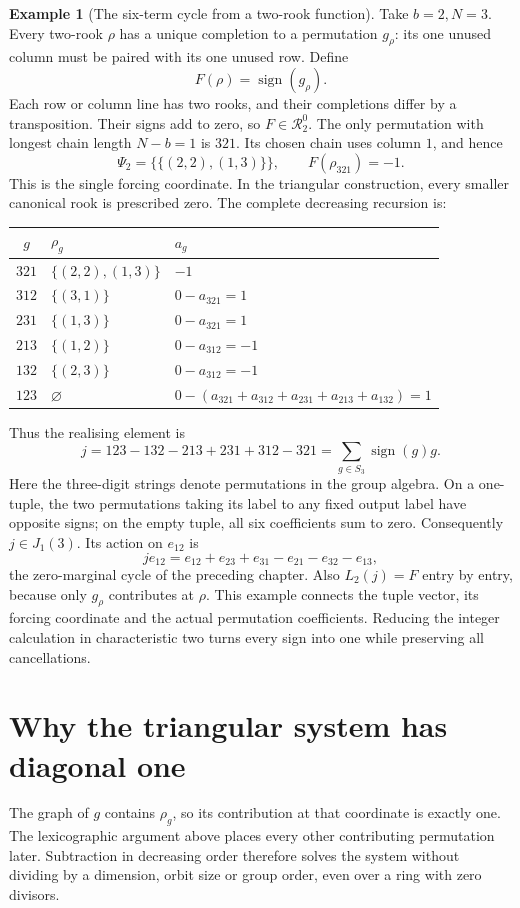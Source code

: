 \documentclass[11pt,a4paper,oneside,openany]{book}
\theoremstyle{definition}\newtheorem{definition}[theorem]{Definition}
\newtheorem{example}[theorem]{Example}
\theoremstyle{remark}\newtheorem{remark}[theorem]{Remark}
\numberwithin{equation}{chapter}
\begin{document}
\begin{example}[The six-term cycle from a two-rook function]\label{tx:eg:two-rook-cycle}
Take $b=2,N=3$. Every two-rook $\rho$ has a unique completion to a permutation $g_\rho$: its one unused column must be paired with its one unused row. Define
\[
                       F(\rho)=\operatorname{sign}(g_\rho).
\]
Each row or column line has two rooks, and their completions differ by a transposition. Their signs add to zero, so $F\in\mathcal R_2^0$. The only permutation with longest chain length $N-b=1$ is $321$. Its chosen chain uses column $1$, and hence
\[
            \Psi_2=\bigl\{\{(2,2),(1,3)\}\bigr\},
            \qquad F(\rho_{321})=-1.
\]
This is the single forcing coordinate. In the triangular construction, every smaller canonical rook is prescribed zero. The complete decreasing recursion is:
\begin{center}
\begin{tabular}{@{}cll@{}}
\toprule
$g$ & $\rho_g$ & $a_g$\\
\midrule
$321$ & $\{(2,2),(1,3)\}$ & $-1$\\
$312$ & $\{(3,1)\}$ & $0-a_{321}=1$\\
$231$ & $\{(1,3)\}$ & $0-a_{321}=1$\\
$213$ & $\{(1,2)\}$ & $0-a_{312}=-1$\\
$132$ & $\{(2,3)\}$ & $0-a_{312}=-1$\\
$123$ & $\varnothing$ & $0-(a_{321}+a_{312}+a_{231}+a_{213}+a_{132})=1$\\
\bottomrule
\end{tabular}
\end{center}
Thus the realising element is
\[
 j=123-132-213+231+312-321
   =\sum_{g\in S_3}\operatorname{sign}(g)g.
\]
Here the three-digit strings denote permutations in the group algebra. On a one-tuple, the two permutations taking its label to any fixed output label have opposite signs; on the empty tuple, all six coefficients sum to zero. Consequently $j\in J_1(3)$. Its action on $e_{12}$ is
\[
 j e_{12}=e_{12}+e_{23}+e_{31}-e_{21}-e_{32}-e_{13},
\]
the zero-marginal cycle of the preceding chapter. Also $L_2(j)=F$ entry by entry, because only $g_\rho$ contributes at $\rho$. This example connects the tuple vector, its forcing coordinate and the actual permutation coefficients. Reducing the integer calculation in characteristic two turns every sign into one while preserving all cancellations.
\end{example}

\section{Why the triangular system has diagonal one}
The graph of $g$ contains $\rho_g$, so its contribution at that coordinate is exactly one. The lexicographic argument above places every other contributing permutation later. Subtraction in decreasing order therefore solves the system without dividing by a dimension, orbit size or group order, even over a ring with zero divisors.
\end{document}
